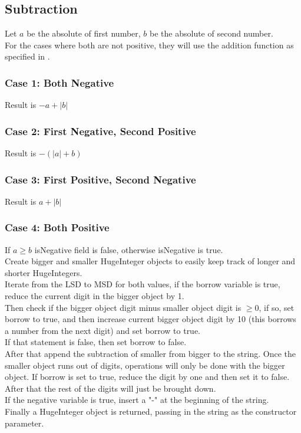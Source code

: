 \documentclass[12pt, letterpaper, titlepage, hidelinks]{article}
\begin{document}
	\subsection{Subtraction}
	\label{section:subtract}
		Let $a$ be the absolute of first number, $b$ be the absolute of second number.\\
		For the cases where both are not positive, they will use the addition function as specified in .
		\subsubsection{Case 1: Both Negative}
			Result is $-a + |b|$
		\subsubsection{Case 2: First Negative, Second Positive}
			Result is $-(|a| + b)$
		\subsubsection{Case 3: First Positive, Second Negative}
			Result is $a + |b|$
		\subsubsection{Case 4: Both Positive}
			If $a \geq b$ isNegative field is false, otherwise isNegative is true.\\
			Create bigger and smaller HugeInteger objects to easily keep track of longer and shorter HugeIntegers.\\
			Iterate from the LSD to MSD for both values, if the borrow variable is true, reduce the current digit in the bigger object by 1.\\
			Then check if the bigger object digit minus smaller object digit is $\geq 0$, if so, set borrow to true, and then increase current bigger object digit by 10 (this borrows a number from the next digit) and set borrow to true.\\
			If that statement is false, then set borrow to false.\\
			After that append the subtraction of smaller from bigger to the string. Once the smaller object runs out of digits, operations will only be done with the bigger object. If borrow is set to true, reduce the digit by one and then set it to false. After that the rest of the digits will just be brought down.\\
			If the negative variable is true, insert a "-" at the beginning of the string.\\
			Finally  a HugeInteger object is returned, passing in the string as the constructor parameter.
\end{document}
